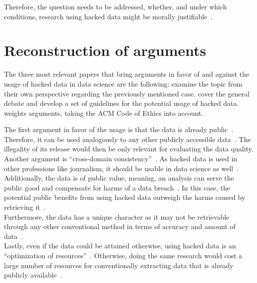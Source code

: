 Therefore, the question needs to be addressed, whether, and under which conditions, research using hacked data might be morally justifiable~\parencite[][745]{nature}.

\section*{Reconstruction of arguments}

The three most relevant papers that bring arguments in favor of and against the usage of hacked data in data science are the following:
\textcite{patreon} examine the topic from their own perspective regarding the previously mentioned case.
\textcite{nature} cover the general debate and develop a set of guidelines for the potential usage of hacked data.
\textcite{acm} weights arguments, taking the ACM Code of Ethics into account.

The first argument in favor of the usage is that the data is already public~\parencite[][5]{patreon}.
Therefore, it can be used analogously to any other publicly accessible data~\parencite[][23]{acm}.
The illegality of its release would then be only relevant for evaluating the data quality.\\
Another argument is ``cross-domain consistency''~\parencite[][746]{nature}.
As hacked data is used in other professions like journalism, it should be usable in data science as well~\parencite[][745]{nature}.\\
Additionally, the data is of public value, meaning, an analysis can serve the public good and compensate for harms of a data breach~\parencites[][5]{patreon}[][23]{acm}.
In this case, the potential public benefits from using hacked data outweigh the harms caused by retrieving it~\parencite[][23]{acm}.\\
Furthermore, the data has a unique character as it may not be retrievable through any other conventional method in terms of accuracy and amount of data~\parencites[][745]{nature}[][5]{patreon}.\\
Lastly, even if the data could be attained otherwise, using hacked data is an ``optimization of resources''~\parencite[][746]{nature}.
Otherwise, doing the same research would cost a large number of resources for conventionally extracting data that is already publicly available~\parencite[][745]{nature}.

